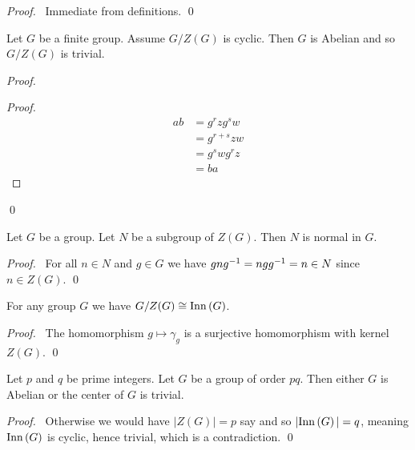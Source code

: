 \begin{proof}
\pf\ Immediate from definitions. \qed
\end{proof}

\begin{lm}
\label{lm:G-ZG-cyclic}
Let $G$ be a finite group. Assume $G / Z(G)$ is cyclic. Then $G$ is Abelian and so $G/Z(G)$ is trivial.
\end{lm}

\begin{proof}
\pf
{}
\begin{proof}
	\pf
	\begin{align*}
		ab & = g^rzg^sw \\
		& = g^{r+s}zw \\
		& = g^swg^rz \\
		& = ba
	\end{align*}
\end{proof}
\qed
\end{proof}

\begin{prop}
\label{prop:subgroup-of-Z-normal}
Let $G$ be a group. Let $N$ be a subgroup of $Z(G)$. Then $N$ is normal in $G$.
\end{prop}

\begin{proof}
\pf\ For all $n \in N$ and $g \in G$ we have $gn{g}^{-1} = ng{g}^{-1} = n \in N$ since $n \in Z(G)$. \qed
\end{proof}

\begin{prop}
For any group $G$ we have $G / Z(G) \cong \mathrm{Inn} \left( {G} \right)$.
\end{prop}

\begin{proof}
\pf\ The homomorphism $g \mapsto \gamma_g$ is a surjective homomorphism with kernel $Z(G)$. \qed
\end{proof}

\begin{prop}
\label{prop:pq-abelian}
Let $p$ and $q$ be prime integers. Let $G$ be a group of order $pq$. Then either $G$ is Abelian or the center of $G$ is trivial.
\end{prop}

\begin{proof}
\pf\ Otherwise we would have $|Z(G)| = p$ say and so $|\mathrm{Inn} \left( {G} \right)| = q$, meaning $\mathrm{Inn} \left( {G} \right)$ is cyclic, hence trivial, which is a contradiction.
\qed
\end{proof}

